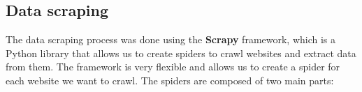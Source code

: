 \subsection{Data scraping}

The data scraping process was done using the \textbf{Scrapy} framework, which is a Python library that allows us to create spiders to crawl websites and extract data from them. The framework is very flexible and allows us to create a spider for each website we want to crawl. The spiders are composed of two main parts: